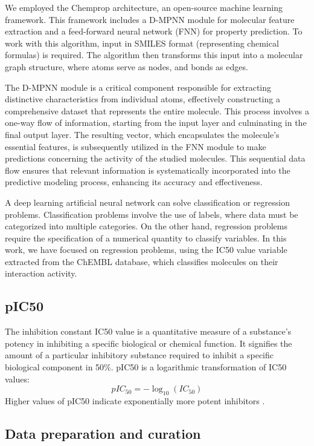 \documentclass[final,times,twocolumn,article]{elsarticle}
\begin{document}
We employed the Chemprop architecture, an open-source machine learning framework. This framework includes a D-MPNN module for molecular feature extraction and a feed-forward neural network (FNN) for property prediction. To work with this algorithm, input in SMILES format (representing chemical formulas) is required. The algorithm then transforms this input into a molecular graph structure, where atoms serve as nodes, and bonds as edges. 

The D-MPNN module is a critical component responsible for extracting distinctive characteristics from individual atoms, effectively constructing a comprehensive dataset that represents the entire molecule. This process involves a one-way flow of information, starting from the input layer and culminating in the final output layer. The resulting vector, which encapsulates the molecule's essential features, is subsequently utilized in the FNN module to make predictions concerning the activity of the studied molecules. This sequential data flow ensures that relevant information is systematically incorporated into the predictive modeling process, enhancing its accuracy and effectiveness. \cite{Wang2022}

A deep learning artificial neural network can solve classification or regression problems. Classification problems involve the use of labels, where data must be categorized into multiple categories. On the other hand, regression problems require the specification of a numerical quantity to classify variables. In this work, we have focused on regression problems, using the IC50 value variable extracted from the ChEMBL database, which classifies molecules on their interaction activity. 

\subsection{pIC50}

The inhibition constant IC50 value is a quantitative measure of a substance's potency in inhibiting a specific biological or chemical function. It signifies the amount of a particular inhibitory substance required to inhibit a specific biological component in 50\%. pIC50 is a logarithmic transformation of IC50 values: 
\begin{equation}
    pIC_{50} = -\log_{10}(IC_{50})
\end{equation}
Higher values of pIC50 indicate exponentially more potent inhibitors \cite{pic50}.

\subsection{Data preparation and curation}
\end{document}
